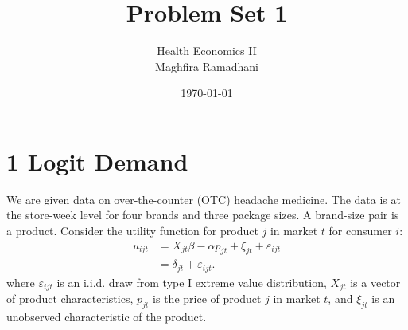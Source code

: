 \documentclass{article}
\begin{document}
 
\title{Problem Set 1}
\author{Health Economics II\\
Maghfira Ramadhani}
\date{\today}
\maketitle

\section*{1 Logit Demand}

We are given data on over-the-counter (OTC) headache medicine. The data is at the store-week level for four brands and three package sizes. A brand-size pair is a product.
Consider the utility function for product $j$ in market $t$ for consumer $i$:
\begin{align*}
    u_{ijt} &=  X_{jt} \beta  - \alpha p_{jt}+ \xi_{jt} + \varepsilon_{ijt} \\
    &=\delta_{jt}+\varepsilon_{ijt}.
\end{align*}
where $\varepsilon_{ijt}$ is an i.i.d. draw from type I extreme value distribution, $X_{jt}$ is a vector of product characteristics, $p_{jt}$ is the price of product $j$ in market $t$, and $\xi_{jt}$ is an unobserved characteristic of the product.
\end{document}
